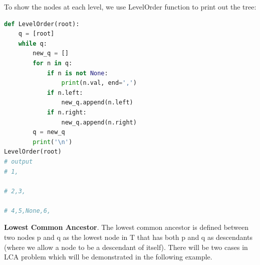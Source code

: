 \documentclass[../main.tex]{subfiles}
\begin{document}
To show the nodes at each level, we use LevelOrder function to print out the tree:
\begin{lstlisting}[language=Python]
def LevelOrder(root):
    q = [root]
    while q:
        new_q = []
        for n in q:
            if n is not None:
                print(n.val, end=',')
            if n.left:
                new_q.append(n.left)
            if n.right:
                new_q.append(n.right)
        q = new_q
        print('\n')
LevelOrder(root)
# output
# 1,

# 2,3,

# 4,5,None,6,
\end{lstlisting}
\textbf{Lowest Common Ancestor}. The lowest common ancestor is defined between two nodes p and q as the lowest node in T that has both p and q as descendants (where we allow a node to be a descendant of itself). There will be two cases in LCA problem which will be demonstrated in the following example. 
\end{document}
